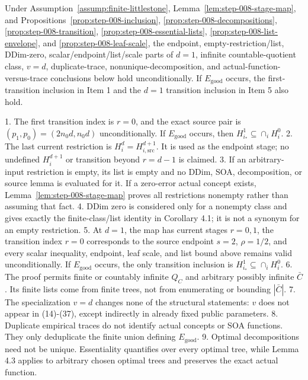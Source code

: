 \begin{proposition}\label{prop:step-008-boundaries}
Under Assumption~\ref{assump:finite-littlestone},
Lemma~\ref{lem:step-008-stage-map}, and
Propositions~\ref{prop:step-008-inclusion},
\ref{prop:step-008-decompositions}, \ref{prop:step-008-transition},
\ref{prop:step-008-essential-lists},
\ref{prop:step-008-list-envelope}, and
\ref{prop:step-008-leaf-scale},
the endpoint, empty-restriction/list, DDim-zero, scalar/endpoint/list/scale
parts of \(d=1\), infinite countable-quotient class, \(v=d\),
duplicate-trace, nonunique-decomposition, and
actual-function-versus-trace conclusions below hold unconditionally. If
\(E_{\mathrm{good}}\) occurs, the first-transition inclusion in Item 1 and
the \(d=1\) transition inclusion in Item 5 also hold.

1. The first transition index is \(r=0\), and the exact source pair is
   \((p_1,p_0)=(2n_0d,n_0d)\) unconditionally. If
   \(E_{\mathrm{good}}\) occurs, then
   \(H_{i_*}^{1}\subseteq\cap_iH_i^0\).
2. The last current restriction is
   \(H_i^d=H_{i,\mathrm{src}}^{d+1}\). It is used as the endpoint stage;
   no undefined \(H_i^{d+1}\) or transition beyond \(r=d-1\) is claimed.
3. If an arbitrary-input restriction is empty, its list is empty and no
   DDim, SOA, decomposition, or source lemma is evaluated for it. If a
   zero-error actual concept exists, Lemma~\ref{lem:step-008-stage-map}
   proves all restrictions nonempty rather than assuming that fact.
4. DDim zero is considered only for a nonempty class and gives exactly the
   finite-class/list identity in Corollary 4.1; it is not a synonym for an
   empty restriction.
5. At \(d=1\), the map has current stages \(r=0,1\), the transition index
   \(r=0\) corresponds to the source endpoint \(s=2\), \(\rho=1/2\), and
   every scalar inequality, endpoint, leaf scale, and list bound above
   remains valid unconditionally. If \(E_{\mathrm{good}}\) occurs, the only
   transition inclusion is \(H_{i_*}^{1}\subseteq\cap_iH_i^0\).
6. The proof permits finite or countably infinite \(Q_C\) and arbitrary
   possibly infinite \(\bar C\). Its finite lists come from finite trees,
   not from enumerating or bounding \(|\bar C|\).
7. The specialization \(v=d\) changes none of the structural statements:
   \(v\) does not appear in (14)-(37), except indirectly in already fixed
   public parameters.
8. Duplicate empirical traces do not identify actual concepts or SOA
   functions. They only deduplicate the  finite union defining
   \(E_{\mathrm{good}}\).
9. Optimal decompositions need not be unique. Essentiality quantifies over
   every optimal tree, while Lemma 4.3 applies to arbitrary chosen optimal
   trees and preserves the exact actual function.


\end{proposition}

